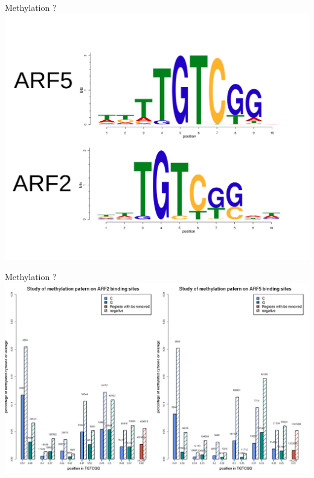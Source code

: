 \documentclass{beamer}
\begin{document}
\begin{frame}{Methylation ?}
  \includegraphics[width=1\textwidth,height=0.90\textheight,center]{logos.png}
\end{frame}

\begin{frame}{Methylation ?}
  \includegraphics[width=1\textwidth,height=0.90\textheight,center]{ARF2_ARF5_methylation_and_sample_sizes_v3.png}
\end{frame}
\end{document}
